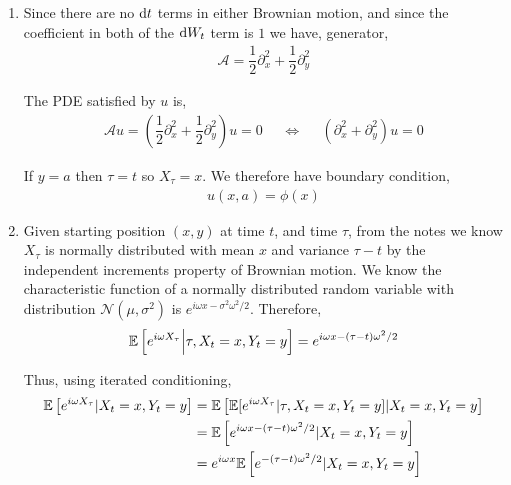 \begin{solution}[Solution]
\begin{enumerate}
    \item 
        Since there are no \( \mathrm{d} t \) terms in either Brownian motion, and since the coefficient in both of the \( \mathrm{d} W_t \) term is \( 1 \) we have, generator,
        \begin{align*}
            \mathcal{A} = \dfrac{1}{2}\partial_x^2 + \dfrac{1}{2}\partial_y^2
        \end{align*}
        
        The PDE satisfied by \( u \) is,
        \begin{align*}
            \mathcal{A} u = \left(\dfrac{1}{2} \partial_x^2 + \dfrac{1}{2}\partial_y^2\right) u = 0 && 
            \Longleftrightarrow
            && \left(\partial_{x}^2 + \partial_{y}^2\right) u = 0
        \end{align*}

        If \( y=a \) then \( \tau = t \) so \( X_\tau = x \). We therefore have boundary condition,
        \begin{align*}
            u(x,a) = \phi(x)
        \end{align*}
        

    \item 
        Given starting position \( (x,y) \) at time \( t \), and time \( \tau \), from the notes we know \( X_\tau \) is normally distributed with mean \( x \) and variance \( \tau - t \) by the independent increments property of Brownian motion. We know the characteristic function of a normally distributed random variable with distribution \( \mathcal{N}(\mu,\sigma^2) \) is \( e^{i\omega x - \sigma^2 \omega^2/2} \). Therefore, 
        \begin{align*}
            \mathbb{E} \left[ e^{i\omega X_\tau} \Big| \tau,X_t = x, Y_t = y \right] = e^{i\omega x - (\tau - t) \omega^2 /2}
        \end{align*}
        
        Thus, using iterated conditioning,
        \begin{align*}
            \mathbb{E} \left[ e^{i\omega X_\tau} | X_t = x, Y_t = y \right]
            &= \mathbb{E} \left[ \mathbb{E}[ e^{i\omega X_\tau} | \tau, X_t = x, Y_t = y] | X_t = x, Y_t = y \right] 
            \\&= \mathbb{E} \left[ e^{i\omega x - (\tau-t)\omega^2/2} | X_t = x, Y_t = y \right]
            \\&= e^{i\omega x}\mathbb{E} \left[ e^{- (\tau-t)\omega^2/2} | X_t = x, Y_t = y \right]
        \end{align*}
        

\end{enumerate}
\end{solution}
